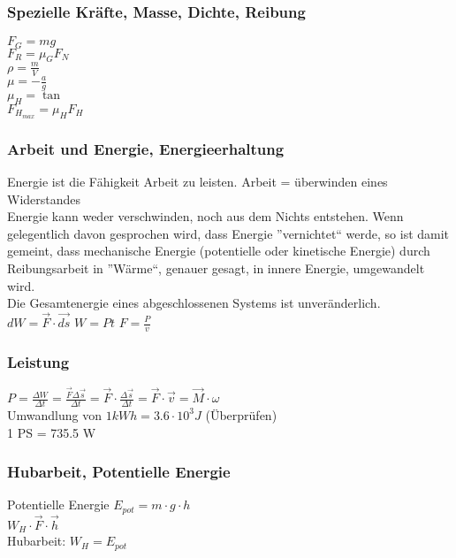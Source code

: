\subsubsection{Spezielle Kräfte, Masse, Dichte, Reibung}
$F_{G} = mg$ \\
$F_{R} = \mu_{G}F_{N}$ \\
$\rho = \frac{m}{V}$ \\
$\mu = - \frac{a}{g}$ \\
$\mu_{H} = \tan{}$ \\
$F_{H_{max}} = \mu_{H}F_{H}$ \\ 

\subsubsection{Arbeit und Energie, Energieerhaltung}
Energie ist die Fähigkeit Arbeit zu leisten. Arbeit = überwinden eines Widerstandes \\
Energie kann weder verschwinden, noch aus dem Nichts entstehen. 
Wenn gelegentlich davon gesprochen wird, dass Energie 
”vernichtet“ werde, so ist damit gemeint, dass mechanische Energie 
(potentielle oder kinetische Energie) durch Reibungsarbeit in 
”Wärme“, genauer gesagt, in innere Energie, umgewandelt wird. \\
Die Gesamtenergie eines abgeschlossenen Systems ist 
unveränderlich. \\
$dW = \overrightarrow{F} \cdot \overrightarrow{ds}$
$W = Pt$
$F = \frac{P}{v}$

\subsubsection{Leistung}

$P = \frac{\Delta W}{\Delta t} = \frac{\overrightarrow{F} \Delta \overrightarrow{s}}{ \Delta t} = \overrightarrow{F} \cdot \frac{\Delta \overrightarrow{s}}{\Delta t} = \overrightarrow{F} \cdot \overrightarrow{v} = \overrightarrow{M} \cdot \omega$ \\
Umwandlung von $1 kWh = 3.6 \cdot 10^3 J $ (Überprüfen) \\
1 PS = 735.5 W


\subsubsection{Hubarbeit, Potentielle Energie}

Potentielle Energie $E_{pot} = m \cdot g \cdot h$ \\
$W_{H} \cdot \overrightarrow{F} \cdot \overrightarrow{h}$ \\
Hubarbeit: $W_{H} = E_{pot}$

